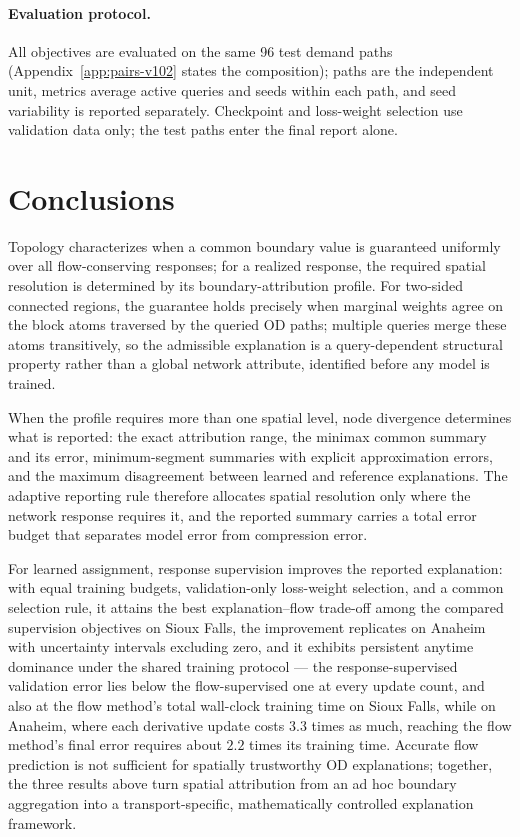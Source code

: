 \documentclass[a4paper,fleqn]{cas-sc}
\begin{document}
\paragraph{Evaluation protocol.}
All objectives are evaluated on the same 96 test demand paths
(Appendix~\ref{app:pairs-v102} states the composition); paths are
the independent unit, metrics average active queries and seeds within
each path, and seed variability is reported separately. Checkpoint and
loss-weight selection use validation data only; the test paths enter
the final report alone.



\FloatBarrier
\section{Conclusions}\label{sec:conclusions}
Topology characterizes when a common boundary value is guaranteed
uniformly over all flow-conserving responses; for a realized response,
the required spatial resolution is determined by its
boundary-attribution profile.
For two-sided connected regions, the guarantee holds precisely when
marginal weights agree on the block atoms traversed by the queried OD
paths; multiple queries merge these atoms transitively, so the
admissible explanation is a query-dependent structural property rather
than a global network attribute, identified before any model is trained.

When the profile requires more than one spatial level, node divergence
determines what is reported: the exact attribution range, the minimax
common summary and its error, minimum-segment summaries with explicit
approximation errors, and the maximum disagreement between learned and
reference explanations. The adaptive reporting rule therefore allocates
spatial resolution only where the network response requires it, and the
reported summary carries a total error budget that separates model
error from compression error.

For learned assignment, response supervision improves the reported
explanation: with equal training budgets, validation-only loss-weight
selection, and a common selection rule, it attains the best
explanation--flow trade-off among the compared supervision objectives
on Sioux Falls, the improvement replicates on Anaheim with uncertainty
intervals excluding zero, and it exhibits persistent anytime dominance
under the shared training protocol --- the response-supervised
validation error lies below the flow-supervised one at every update
count, and also at the flow method's total wall-clock training time on
Sioux Falls, while on Anaheim, where each derivative update costs
$3.3$ times as much, reaching the flow method's final error requires
about $2.2$ times its training time. Accurate flow
prediction is not sufficient for spatially trustworthy OD explanations;
together, the three results above turn spatial attribution from an ad
hoc boundary aggregation into a transport-specific, mathematically
controlled explanation framework.
\end{document}
